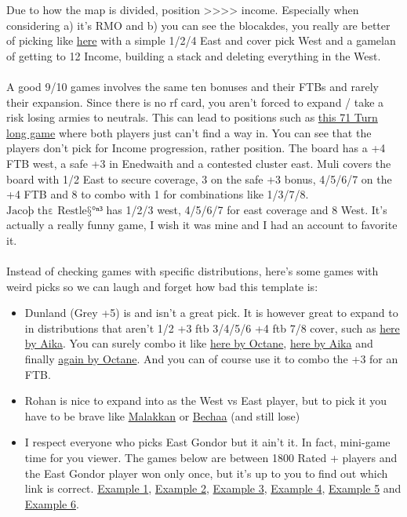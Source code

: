Due to how the map is divided, position >>>> income. Especially when considering a) it's RMO and b) you can see the blocakdes, you really are better of picking like \href{https://www.warzone.com/MultiPlayer?GameID=41216429}{here} with a simple 1/2/4 East and cover pick West and a gamelan of getting to 12 Income, building a stack and deleting everything in the West.
\\
\\
A good 9/10 games involves the same ten bonuses and their FTBs and rarely their expansion. Since there is no rf card, you aren't forced to expand / take a risk losing armies to neutrals. This can lead to positions such as \href{https://www.warzone.com/MultiPlayer?GameID=38352157}{this 71 Turn long game} where both players just can't find a way in. You can see that the players don't pick for Income progression, rather position. The board has a +4 FTB west, a safe +3 in Enedwaith and a contested cluster east. Muli covers the board with 1/2 East to secure coverage, 3 on the safe +3 bonus, 4/5/6/7 on the +4 FTB and 8 to combo with 1 for combinations like 1/3/7/8. $\text{Jacoþ thε Restle§°ⁿ³}$ has 1/2/3 west, 4/5/6/7 for east coverage and 8 West. It's actually a really funny game, I wish it was mine and I had an account to favorite it.
\\
\\
Instead of checking games with specific distributions, here's some games with weird picks so we can laugh and forget how bad this template is:
\begin{itemize}
    \item Dunland (Grey +5) is and isn't a great pick. It is however great to expand to in distributions that aren't 1/2 +3 ftb 3/4/5/6 +4 ftb 7/8 cover, such as \href{https://www.warzone.com/MultiPlayer?GameID=41315344}{here by Aika}. You can surely combo it like \href{https://www.warzone.com/MultiPlayer?GameID=38140304}{here by Octane}, \href{https://www.warzone.com/MultiPlayer?GameID=40139613}{here by Aika} and finally \href{https://www.warzone.com/MultiPlayer?GameID=33355814}{again by Octane}. And you can of course use it to combo the +3 for an FTB.
    \item Rohan is nice to expand into as the West vs East player, but to pick it you have to be brave like \href{https://www.warzone.com/MultiPlayer?GameID=38695939}{Malakkan} or \href{https://www.warzone.com/MultiPlayer?GameID=33861437}{Bechaa} (and still lose)
    \item I respect everyone who picks East Gondor but it ain't it. In fact, mini-game time for you viewer. The games below are between 1800 Rated + players and the East Gondor player won only once, but it's up to you to find out which link is correct. \href{https://www.warzone.com/MultiPlayer?GameID=36755511}{Example 1}, \href{https://www.warzone.com/MultiPlayer?GameID=36668057}{Example 2}, \href{https://www.warzone.com/MultiPlayer?GameID=29914718}{Example 3}, \href{https://www.warzone.com/MultiPlayer?GameID=25557005}{Example 4}, \href{https://www.warzone.com/MultiPlayer?GameID=16951613}{Example 5} and \href{https://www.warzone.com/MultiPlayer?GameID=15253205}{Example 6}.
\end{itemize}
